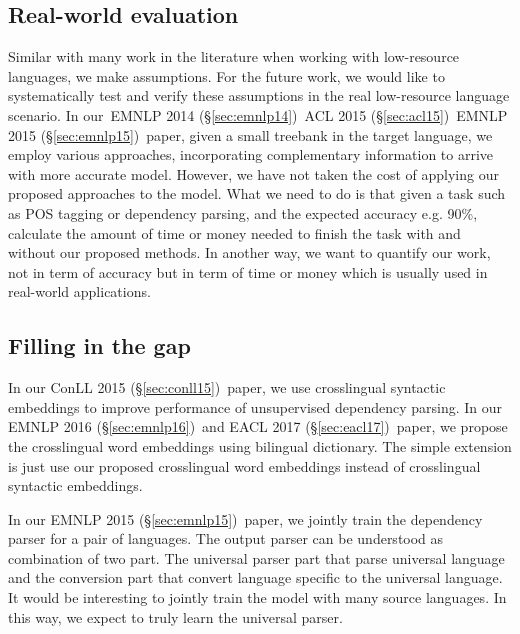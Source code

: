 \documentclass[12pt,twoside,final,hidelinks]{ltthesis}
\theoremstyle{definition}
\newcommand\emnlpiv{EMNLP 2014 (\S\ref{sec:emnlp14})}
\newcommand\conllv{ConLL 2015 (\S\ref{sec:conll15})}
\newcommand\aclv{ACL 2015 (\S\ref{sec:acl15})}
\newcommand\emnlpv{EMNLP 2015 (\S\ref{sec:emnlp15})}
\newcommand\emnlpvi{EMNLP 2016 (\S\ref{sec:emnlp16})}
\newcommand\eaclvii{EACL 2017 (\S\ref{sec:eacl17})}
\begin{document}
\subsection{Real-world evaluation}
Similar with many work in the literature when working with low-resource languages, we make assumptions. 
For the future work, we would like to systematically test and verify these assumptions in the real low-resource language scenario.
In our~\emnlpiv\, \aclv\, \emnlpv\ paper, given a small treebank in the target language, we employ various approaches, incorporating 
complementary information to arrive with more accurate model. However, we have not taken the cost of applying our proposed approaches to 
the model. %
What we need to do is that given a task such as POS tagging or dependency parsing, and the expected accuracy e.g. 90\%, calculate the amount 
of time or money needed to finish the task with and without our proposed methods. In another way, we want to quantify our work, not in term 
of accuracy but in term of time or money which is usually used in real-world applications. 

\subsection{Filling in  the gap}
In our \conllv\ paper, we use crosslingual syntactic embeddings to improve performance of unsupervised dependency parsing. In our \emnlpvi\ and \eaclvii\ paper, 
we propose the crosslingual word embeddings using bilingual dictionary. The simple extension is just use our proposed crosslingual word embeddings instead of 
crosslingual syntactic embeddings. 

In our \emnlpv\ paper, we jointly train the dependency parser for a pair of languages. The output parser can be understood as combination of two part. The universal
parser part that parse universal language and the conversion part that convert language specific to the universal language. It would be interesting to jointly train the model with many source languages. In this way, we expect to truly learn the universal parser. 
\end{document}
